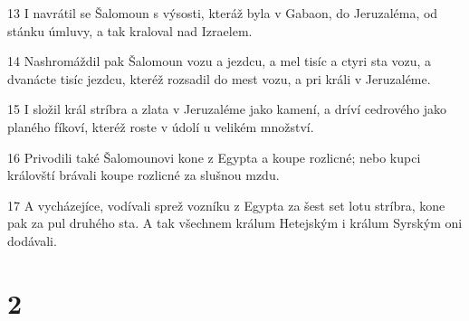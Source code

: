 \par 13 I navrátil se Šalomoun s výsosti, kteráž byla v Gabaon, do Jeruzaléma, od stánku úmluvy, a tak kraloval nad Izraelem.
\par 14 Nashromáždil pak Šalomoun vozu a jezdcu, a mel tisíc a ctyri sta vozu, a dvanácte tisíc jezdcu, kteréž rozsadil do mest vozu, a pri králi v Jeruzaléme.
\par 15 I složil král stríbra a zlata v Jeruzaléme jako kamení, a dríví cedrového jako planého fíkoví, kteréž roste v údolí u velikém množství.
\par 16 Privodili také Šalomounovi kone z Egypta a koupe rozlicné; nebo kupci královští brávali koupe rozlicné za slušnou mzdu.
\par 17 A vycházejíce, vodívali sprež vozníku z Egypta za šest set lotu stríbra, kone pak za pul druhého sta. A tak všechnem králum Hetejským i králum Syrským oni dodávali.

\chapter{2}

